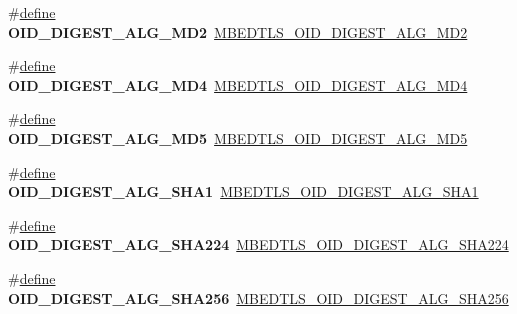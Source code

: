 \begin{DoxyCompactItemize}
\mbox{\label{compat-1_83_8h_a04aa6fd4e47d25ddfb9961fba1e551a3}} 
\#\hyperlink{structdefine}{define} {\bfseries O\+I\+D\+\_\+\+D\+I\+G\+E\+S\+T\+\_\+\+A\+L\+G\+\_\+\+M\+D2}~\hyperlink{oid_8h_a5683b895dfdb0efd8ed461837e8da7a1}{M\+B\+E\+D\+T\+L\+S\+\_\+\+O\+I\+D\+\_\+\+D\+I\+G\+E\+S\+T\+\_\+\+A\+L\+G\+\_\+\+M\+D2}
\item 
\mbox{\label{compat-1_83_8h_a653b661a06467aff6d711c0b388f197d}} 
\#\hyperlink{structdefine}{define} {\bfseries O\+I\+D\+\_\+\+D\+I\+G\+E\+S\+T\+\_\+\+A\+L\+G\+\_\+\+M\+D4}~\hyperlink{oid_8h_a99fd3f40fd5ab8242eae58f46ecc3778}{M\+B\+E\+D\+T\+L\+S\+\_\+\+O\+I\+D\+\_\+\+D\+I\+G\+E\+S\+T\+\_\+\+A\+L\+G\+\_\+\+M\+D4}
\item 
\mbox{\label{compat-1_83_8h_a83d17239c3b3b4ae90feaff89228a936}} 
\#\hyperlink{structdefine}{define} {\bfseries O\+I\+D\+\_\+\+D\+I\+G\+E\+S\+T\+\_\+\+A\+L\+G\+\_\+\+M\+D5}~\hyperlink{oid_8h_a48fad9d4b63fd94ea67b8dca0dd1933b}{M\+B\+E\+D\+T\+L\+S\+\_\+\+O\+I\+D\+\_\+\+D\+I\+G\+E\+S\+T\+\_\+\+A\+L\+G\+\_\+\+M\+D5}
\item 
\mbox{\label{compat-1_83_8h_aacf90b59c73d2cc5d724079e4b2d60a6}} 
\#\hyperlink{structdefine}{define} {\bfseries O\+I\+D\+\_\+\+D\+I\+G\+E\+S\+T\+\_\+\+A\+L\+G\+\_\+\+S\+H\+A1}~\hyperlink{oid_8h_a0d6d3de544d2701dcc180fe538f830a0}{M\+B\+E\+D\+T\+L\+S\+\_\+\+O\+I\+D\+\_\+\+D\+I\+G\+E\+S\+T\+\_\+\+A\+L\+G\+\_\+\+S\+H\+A1}
\item 
\mbox{\label{compat-1_83_8h_a20b1e7ad3ca31e8a6ace664303ca3798}} 
\#\hyperlink{structdefine}{define} {\bfseries O\+I\+D\+\_\+\+D\+I\+G\+E\+S\+T\+\_\+\+A\+L\+G\+\_\+\+S\+H\+A224}~\hyperlink{oid_8h_a9901a9fc6c04cd3396bfce7578fe8782}{M\+B\+E\+D\+T\+L\+S\+\_\+\+O\+I\+D\+\_\+\+D\+I\+G\+E\+S\+T\+\_\+\+A\+L\+G\+\_\+\+S\+H\+A224}
\item 
\mbox{\label{compat-1_83_8h_ae981ca44d5353aa8dd4fcf96fa33446f}} 
\#\hyperlink{structdefine}{define} {\bfseries O\+I\+D\+\_\+\+D\+I\+G\+E\+S\+T\+\_\+\+A\+L\+G\+\_\+\+S\+H\+A256}~\hyperlink{oid_8h_a0c139de494bd65ff1f5b3fb8460d66f2}{M\+B\+E\+D\+T\+L\+S\+\_\+\+O\+I\+D\+\_\+\+D\+I\+G\+E\+S\+T\+\_\+\+A\+L\+G\+\_\+\+S\+H\+A256}
\item 
\mbox{\label{compat-1_83_8h_a4d3fb122020645d9615c8032f8dd0bbd}} 

\end{DoxyCompactItemize}
